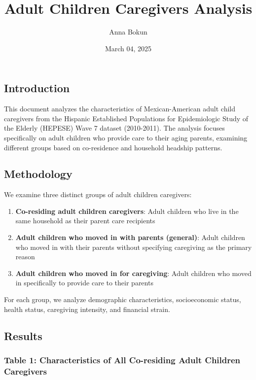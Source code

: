 \documentclass[
]{article}
\title{Adult Children Caregivers Analysis}
\author{Anna Bokun}
\date{March 04, 2025}
\providecommand{\tightlist}{%
  \setlength{\itemsep}{0pt}\setlength{\parskip}{0pt}}
\begin{document}
\maketitle

{
\setcounter{tocdepth}{2}
\tableofcontents
}
\subsection{Introduction}\label{introduction}

This document analyzes the characteristics of Mexican-American adult
child caregivers from the Hispanic Established Populations for
Epidemiologic Study of the Elderly (HEPESE) Wave 7 dataset (2010-2011).
The analysis focuses specifically on adult children who provide care to
their aging parents, examining different groups based on co-residence
and household headship patterns.

\subsection{Methodology}\label{methodology}

We examine three distinct groups of adult children caregivers:

\begin{enumerate}
\def\labelenumi{\arabic{enumi}.}
\tightlist
\item
  \textbf{Co-residing adult children caregivers}: Adult children who
  live in the same household as their parent care recipients
\item
  \textbf{Adult children who moved in with parents (general)}: Adult
  children who moved in with their parents without specifying caregiving
  as the primary reason
\item
  \textbf{Adult children who moved in for caregiving}: Adult children
  who moved in specifically to provide care to their parents
\end{enumerate}

For each group, we analyze demographic characteristics, socioeconomic
status, health status, caregiving intensity, and financial strain.

\subsection{Results}\label{results}

\subsubsection{Table 1: Characteristics of All Co-residing Adult
Children
Caregivers}\label{table-1-characteristics-of-all-co-residing-adult-children-caregivers}
\end{document}

